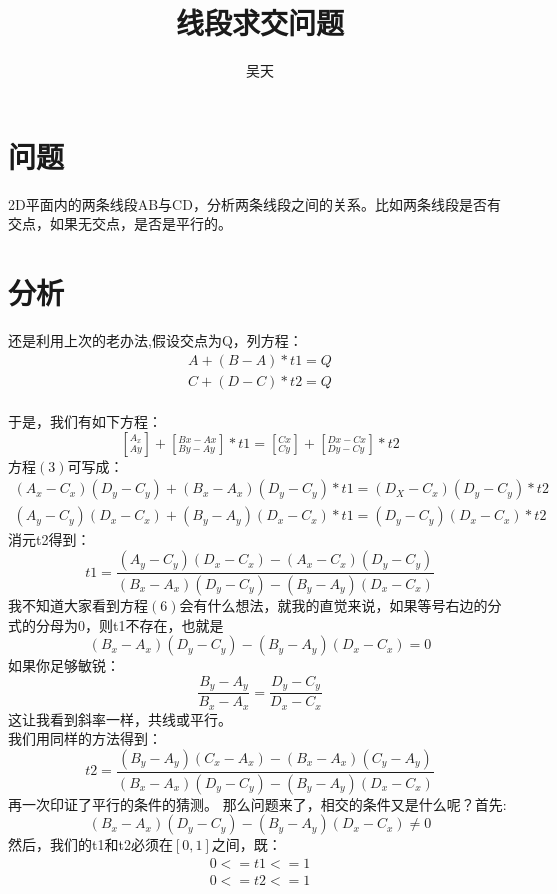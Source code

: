 \documentclass[UTF8,12pt]{article}
\title{线段求交问题}
\author{吴天}
\begin{document}
\maketitle
\section{问题}
	2D平面内的两条线段AB与CD，分析两条线段之间的关系。比如两条线段是否有交点，如果无交点，是否是平行的。
	
\section{分析}
	还是利用上次的老办法,假设交点为Q，列方程：
	\begin{eqnarray}
	A+(B-A) * t1 = Q \\
	C+(D-C) * t2 = Q
	\end{eqnarray}\\
	于是，我们有如下方程：
	\begin{equation}
	\left[^{A_x}_{Ay}\right] + \left[^{Bx-Ax}_{By-Ay}\right] * t1 = 	\left[^{Cx}_{Cy}\right] +  \left[^{Dx-Cx}_{Dy-Cy}\right] * t2
	\end{equation}
	方程$(3)$可写成：
	\begin{eqnarray}
		(A_x - C_x)(D_y - C_y)+(B_x -A_x)(D_y-C_y)*t1 = (D_X - C_x)(D_y - C_y)*t2\\
		(A_y-C_y)(D_x-C_x) +(B_y-A_y)(D_x-C_x) * t1 = (D_y-C_y)(D_x-C_x) * t2
	\end{eqnarray}
	消元t2得到：
	\begin{equation}
	t1 = \frac{(A_y-C_y)(D_x-C_x) - (A_x-C_x)(D_y-C_y)}{(B_x-A_x)(D_y-C_y)-(B_y-A_y)(D_x-C_x)}
	\end{equation}
	我不知道大家看到方程$(6)$会有什么想法，就我的直觉来说，如果等号右边的分式的分母为0，则t1不存在，也就是$$(B_x-A_x)(D_y-C_y)-(B_y-A_y)(D_x-C_x)=0$$
	如果你足够敏锐：$$\frac{B_y-A_y}{B_x-A_x}=\frac{D_y-C_y}{D_x-C_x}$$
	这让我看到斜率一样，共线或平行。\\
	我们用同样的方法得到：
	\begin{equation}
	t2 = \frac{(B_y-A_y)(C_x-A_x) - (B_x-A_x)(C_y-A_y)}{(B_x-A_x)(D_y-C_y)-(B_y-A_y)(D_x-C_x)}
	\end{equation}
	再一次印证了平行的条件的猜测。
	那么问题来了，相交的条件又是什么呢？首先:
	$$(B_x-A_x)(D_y-C_y)-(B_y-A_y)(D_x-C_x)\neq0$$
	然后，我们的t1和t2必须在$\left[0,1\right]$之间，既：
	\begin{eqnarray}
	0<=t1<=1\\
	0<=t2<=1
	\end{eqnarray}
\end{document}
